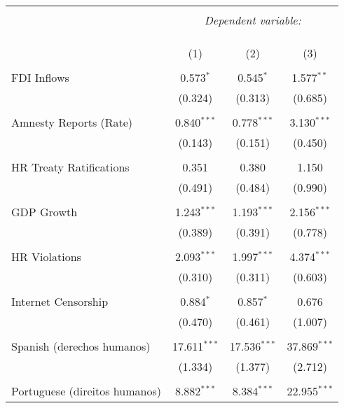 
\begin{table}[!htbp] \centering 
  \caption{} 
  \label{} 
\begin{tabular}{@{\extracolsep{5pt}}lccc} 
\\[-1.8ex]\hline 
\hline \\[-1.8ex] 
 & \multicolumn{3}{c}{\textit{Dependent variable:}} \\ 
\cline{2-4} 
\\[-1.8ex] & \multicolumn{3}{c}{ } \\ 
\\[-1.8ex] & (1) & (2) & (3)\\ 
\hline \\[-1.8ex] 
 FDI Inflows & 0.573$^{*}$ & 0.545$^{*}$ & 1.577$^{**}$ \\ 
  & (0.324) & (0.313) & (0.685) \\ 
  & & & \\ 
 Amnesty Reports (Rate) & 0.840$^{***}$ & 0.778$^{***}$ & 3.130$^{***}$ \\ 
  & (0.143) & (0.151) & (0.450) \\ 
  & & & \\ 
 HR Treaty Ratifications & 0.351 & 0.380 & 1.150 \\ 
  & (0.491) & (0.484) & (0.990) \\ 
  & & & \\ 
 GDP Growth & 1.243$^{***}$ & 1.193$^{***}$ & 2.156$^{***}$ \\ 
  & (0.389) & (0.391) & (0.778) \\ 
  & & & \\ 
 HR Violations & 2.093$^{***}$ & 1.997$^{***}$ & 4.374$^{***}$ \\ 
  & (0.310) & (0.311) & (0.603) \\ 
  & & & \\ 
 Internet Censorship & 0.884$^{*}$ & 0.857$^{*}$ & 0.676 \\ 
  & (0.470) & (0.461) & (1.007) \\ 
  & & & \\ 
 Spanish (derechos humanos) & 17.611$^{***}$ & 17.536$^{***}$ & 37.869$^{***}$ \\ 
  & (1.334) & (1.377) & (2.712) \\ 
  & & & \\ 
 Portuguese (direitos humanos) & 8.882$^{***}$ & 8.384$^{***}$ & 22.955$^{***}$ \\ 

\end{tabular}
\end{table}
